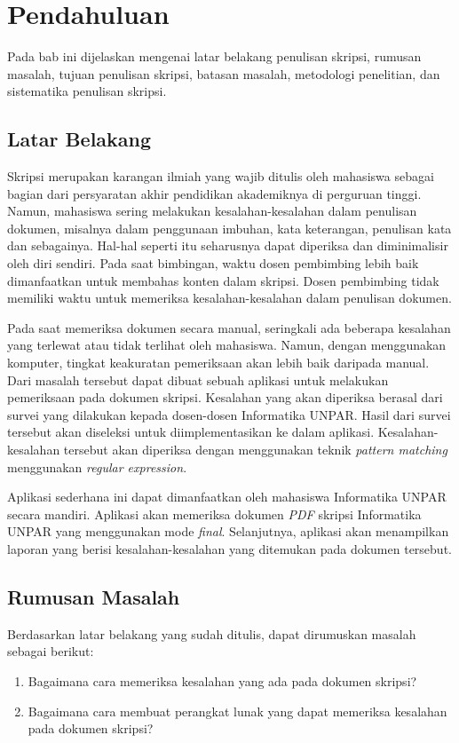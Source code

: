\chapter{Pendahuluan}
\label{chap:intro}
   
Pada bab ini dijelaskan mengenai latar belakang penulisan skripsi, rumusan masalah, tujuan penulisan skripsi, batasan masalah, metodologi penelitian, dan sistematika penulisan skripsi.

\section{Latar Belakang}
\label{sec:label}

Skripsi merupakan karangan ilmiah yang wajib ditulis oleh mahasiswa sebagai bagian dari persyaratan akhir pendidikan akademiknya di perguruan tinggi. Namun, mahasiswa sering melakukan kesalahan-kesalahan dalam penulisan dokumen, misalnya dalam penggunaan imbuhan, kata keterangan, penulisan kata dan sebagainya. Hal-hal seperti itu seharusnya dapat diperiksa dan diminimalisir oleh diri sendiri. Pada saat bimbingan, waktu dosen pembimbing lebih baik dimanfaatkan untuk membahas konten dalam skripsi. Dosen pembimbing tidak memiliki waktu untuk memeriksa kesalahan-kesalahan dalam penulisan dokumen. 

Pada saat memeriksa dokumen secara manual, seringkali ada beberapa kesalahan yang terlewat atau tidak terlihat oleh mahasiswa. Namun, dengan menggunakan komputer, tingkat keakuratan pemeriksaan akan lebih baik daripada manual. Dari masalah tersebut dapat dibuat sebuah aplikasi untuk melakukan pemeriksaan pada dokumen skripsi. Kesalahan yang akan diperiksa berasal dari survei yang dilakukan kepada dosen-dosen Informatika UNPAR. Hasil dari survei tersebut akan diseleksi untuk diimplementasikan ke dalam aplikasi. Kesalahan-kesalahan tersebut akan diperiksa dengan menggunakan teknik \textit{pattern matching} menggunakan \textit{regular expression}.

Aplikasi sederhana ini dapat dimanfaatkan oleh mahasiswa Informatika UNPAR secara mandiri. Aplikasi akan memeriksa dokumen \textit{PDF} skripsi Informatika UNPAR yang menggunakan mode \textit{final}. Selanjutnya, aplikasi akan menampilkan laporan yang berisi kesalahan-kesalahan yang ditemukan pada dokumen tersebut.

\section{Rumusan Masalah}
\label{sec:rumusan}
Berdasarkan latar belakang yang sudah ditulis, dapat dirumuskan masalah sebagai berikut:
\begin{enumerate}
	\item Bagaimana cara memeriksa kesalahan yang ada pada dokumen skripsi?
	\item Bagaimana cara membuat perangkat lunak yang dapat memeriksa kesalahan pada dokumen skripsi?
\end{enumerate}

